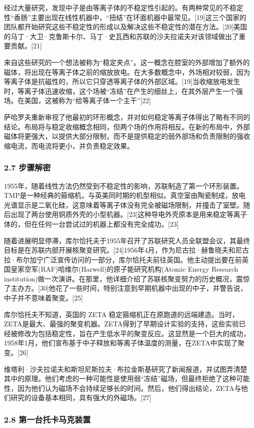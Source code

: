 经过大量研究，发现中子是由等离子体的不稳定性引起的。有两种常见的不稳定性“香肠”主要出现在线性机器中，“扭结”在环面机器中最常见。[19]这三个国家的团队都开始研究这些不稳定性的形成以及解决这些不稳定性的潜在方法。[20]美国的马丁·大卫·克鲁斯卡尔、马丁·史瓦西和苏联的沙夫拉诺夫对该领域做出了重要贡献。[21]

来自这些研究的一个想法被称为“稳定夹点”。这一概念在腔室的外部增加了额外的磁体，将出现在等离子体之前的缩放放电。在大多数概念中，外场相对较弱，因为等离子体是抗磁性的，所以它只穿透等离子体的外部区域。[19]当收缩放电发生时，等离子体迅速收缩，这个场被“冻结”在产生的细丝上，在其外层产生一个强场。在美国，这被称为“给等离子体一个主干”[22]

萨哈罗夫重新审视了他最初的环形概念，并对如何稳定等离子体得出了略有不同的结论。布局将与稳定收缩概念相同，但两个场的作用将相反。在新的布局中，外部磁体将更强大，以提供大部分限制，而不是提供稳定的弱外部场和负责限制的强收缩电流，而电流将更小，并负责稳定效果。
\subsubsection{2.7 步骤解密}
1955年，随着线性方法仍然受到不稳定性的影响，苏联制造了第一个环形装置。TMP是一种经典的箍缩机，与英美同时期的机型相似。真空室由陶瓷制成，放电光谱显示是二氧化硅，这意味着等离子体没有完全被磁场限制，并撞击了室壁。随后出现了两台使用铜质外壳的小型机器。[23]这种导电外壳原本是用来稳定等离子体的，但在任何一台尝试过的机器上都没有完全成功。[23]

随着进展明显停滞，库尔恰托夫于1955年召开了苏联研究人员全联盟会议，其最终目标是在苏联内部开展核聚变研究。[24]1956年4月，作为尼古拉·赫鲁晓夫和尼古拉·布尔加宁广泛宣传访问的一部分，库尔恰托夫前往英国。他主动提出要在前英国皇家空军(RAF)哈维尔(Harwell)的原子能研究机构(Atomic Energy Research institution)做一次演讲。在那里，他详细介绍了苏联核聚变努力的历史概况，震惊了主办方。[30]他花了一些时间，特别注意到早期机器中出现的中子，并警告说，中子并不意味着聚变。[25]

库尔恰托夫不知道，英国的 ZETA 稳定箍缩机正在原跑道的远端建造。当时，ZETA是最大、最强的聚变机器。ZETA得到了早期设计实验的支持，这些实验已经被修改为包括稳定性，旨在产生低水平的聚变反应。这显然是一个巨大的成功，1958年1月，他们宣布基于中子释放和等离子体温度的测量，在ZETA中实现了聚变。[26]

维塔利·沙夫拉诺夫和斯坦尼斯拉夫·布拉金斯基研究了新闻报道，并试图弄清楚其中的原理。他们考虑的一种可能性是使用弱“冻结”磁场，但最终拒绝了这种可能性，因为他们认为磁场不会持续足够长的时间。然后，他们得出结论，ZETA与他们研究的设备基本相同，具有强大的外磁场。[27]
\subsubsection{2.8 第一台托卡马克装置}